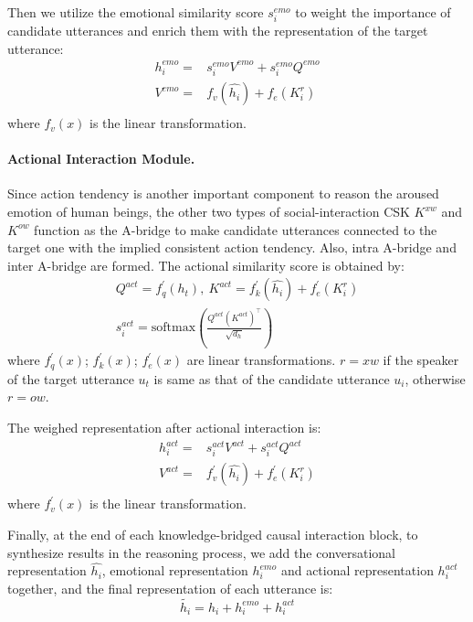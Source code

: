 \documentclass[letterpaper]{article} \usepackage{aaai23}  \usepackage{times}  \usepackage{helvet}  \usepackage{courier}  \usepackage[hyphens]{url}  \usepackage{graphicx} \urlstyle{rm} \def\UrlFont{\rm}  \usepackage{natbib}  \usepackage{caption} \frenchspacing  \setlength{\pdfpagewidth}{8.5in} \setlength{\pdfpageheight}{11in} \usepackage{algorithm}
\begin{document}
Then we utilize the emotional similarity score $s_i^{emo}$ to weight the importance of candidate utterances and enrich them with the representation of the target utterance:
\begin{equation}
\begin{aligned}
    h^{emo}_i = &s_i^{emo} V^{emo} + s_i^{emo} Q^{emo}\\
    V^{emo} = &f_v(\hat{h_i}) + f_e(K^{r}_i) \\
    \end{aligned}
\end{equation}
where $f_v(x)$ is the linear transformation.

\paragraph{Actional Interaction Module.}
Since action tendency is another important component to reason the aroused emotion of human beings, the other two types of social-interaction CSK $K^{xw}$ and $K^{ow}$ function as the A-bridge to make candidate utterances connected to the target one with the implied consistent action tendency. Also, intra A-bridge and inter A-bridge are formed. The actional similarity score is obtained by:
\begin{equation}
\begin{aligned}
    Q^{act} = f_q^{\prime}(h_t), \ K^{act} = f_k^{\prime}(\hat{h_i}) + f_e^{\prime}(K^{r}_i) \\
    s_i^{act} = \mathrm{softmax}(\frac{Q^{act} (K^{act})^\top}{\sqrt{d_h}})
    \end{aligned}
\end{equation}
where $f_q^{\prime}(x)$; $f_k^{\prime}(x)$; $f_e^{\prime}(x)$ are linear transformations. $r=xw$ if the speaker of the target utterance $u_t$ is same as that of the candidate utterance $u_i$, otherwise $r=ow$.

The weighed representation after actional interaction is:
\begin{equation}
\begin{aligned}
    h^{act}_i = &s_i^{act} V^{act} + s_i^{act} Q^{act}\\
    V^{act} = &f_v^{\prime}(\hat{h_i}) + f_e^{\prime}(K^{r}_i) \\
    \end{aligned}
\end{equation}
where $f_v^{\prime}(x)$ is the linear transformation.

Finally, at the end of each knowledge-bridged causal interaction block, to synthesize results in the reasoning process, we add the conversational representation $\hat{h_i}$, emotional representation $h_i^{emo}$ and actional representation $h_i^{act}$ together, and the final representation of each utterance is:
\begin{equation}
    \tilde{h_i} = \hat{h_i} + h_i^{emo} + h_i^{act}
\end{equation}
\end{document}
